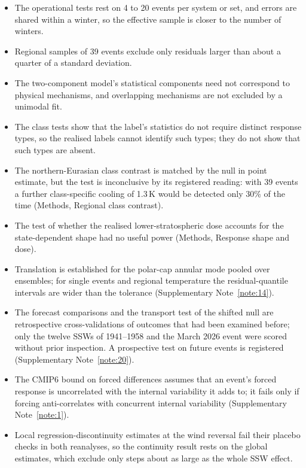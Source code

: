 \documentclass[11pt]{article}
\begin{document}
\begin{itemize}[leftmargin=*,itemsep=1pt]
  \item The operational tests rest on 4 to 20 events per system or set, and errors are shared within a winter, so the effective sample is closer to the number of winters.
  \item Regional samples of 39 events exclude only residuals larger than about a quarter of a standard deviation.
  \item The two-component model's statistical components need not correspond to physical mechanisms, and overlapping mechanisms are not excluded by a unimodal fit.
  \item The class tests show that the label's statistics do not require distinct response types, so the realised labels cannot identify such types; they do not show that such types are absent.
  \item The northern-Eurasian class contrast is matched by the null in point estimate, but the test is inconclusive by its registered reading: with 39 events a further class-specific cooling of 1.3\,K would be detected only 30\% of the time (Methods, Regional class contrast).
  \item The test of whether the realised lower-stratospheric dose accounts for the state-dependent shape had no useful power (Methods, Response shape and dose).
  \item Translation is established for the polar-cap annular mode pooled over ensembles; for single events and regional temperature the residual-quantile intervals are wider than the tolerance (Supplementary Note~\ref{note:14}).
  \item The forecast comparisons and the transport test of the shifted null are retrospective cross-validations of outcomes that had been examined before; only the twelve SSWs of 1941–1958 and the March 2026 event were scored without prior inspection. A prospective test on future events is registered (Supplementary Note~\ref{note:20}).
  \item The CMIP6 bound on forced differences assumes that an event's forced response is uncorrelated with the internal variability it adds to; it fails only if forcing anti-correlates with concurrent internal variability (Supplementary Note~\ref{note:1}).
  \item Local regression-discontinuity estimates at the wind reversal fail their placebo checks in both reanalyses, so the continuity result rests on the global estimates, which exclude only steps about as large as the whole SSW effect.
\end{itemize}
\end{document}

